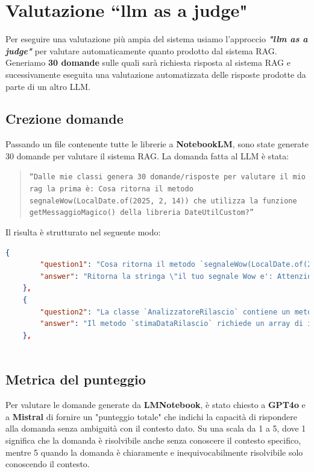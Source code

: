 \documentclass[12pt,a4paper,openright,twoside]{book}
\begin{document}
\section{Valutazione ``llm as a judge"}
Per eseguire una valutazione più ampia del sistema usiamo l'approccio \textbf{\emph{"llm as a judge"}} per valutare automaticamente quanto prodotto dal sistema RAG.
Generiamo \textbf{30 domande} sulle quali sarà richiesta risposta al sistema RAG e sucessivamente eseguita una valutazione automatizzata delle risposte prodotte da parte di un altro LLM.
\subsection{Crezione domande}
Passando un file contenente tutte le librerie a \textbf{NotebookLM}, sono state generate 30 domande per valutare il sistema RAG.
La domanda fatta al LLM è stata:
\begin{quote}
    \texttt{``Dalle mie classi genera 30 domande/risposte per valutare il mio rag la prima è:
    \newline Cosa ritorna il metodo segnaleWow(LocalDate.of(2025, 2, 14))
    che utilizza la funzione getMessaggioMagico() della libreria
    DateUtilCustom?''}
\end{quote}
Il risulta è strutturato nel seguente modo:
\begin{lstlisting}[language=json, caption={Domande/Risposte generate da NotebookLM}]
    {
        "question1": "Cosa ritorna il metodo `segnaleWow(LocalDate.of(2025, 2, 14))` che utilizza la funzione `getMessaggioMagico()` della libreria `DateUtilCustom`?",
        "answer": "Ritorna la stringa \"il tuo segnale Wow e': Attenzione agli incantesimi del crepuscolo.\""
    },
    {
        "question2": "La classe `AnalizzatoreRilascio` contiene un metodo chiamato `stimaDataRilascio`. Quali sono i due parametri di input richiesti da questo metodo?",
        "answer": "Il metodo `stimaDataRilascio` richiede un array di interi (`int[] taskCompletati`) e un valore double (`double velocitaSviluppo`) come input."
    },
 
\end{lstlisting}
\subsection{Metrica del punteggio}
Per valutare le domande generate da \textbf{LMNotebook}, è stato chiesto a \textbf{GPT4o} e a \textbf{Mistral} di 
fornire un "punteggio totale" che indichi la capacità di rispondere alla domanda senza ambiguità con il contesto dato.
Su una scala da 1 a 5, dove 1 significa che la domanda è risolvibile anche senza conoscere il contesto specifico, mentre 5 quando la domanda è chiaramente e inequivocabilmente risolvibile solo conoscendo il contesto.
\end{document}

